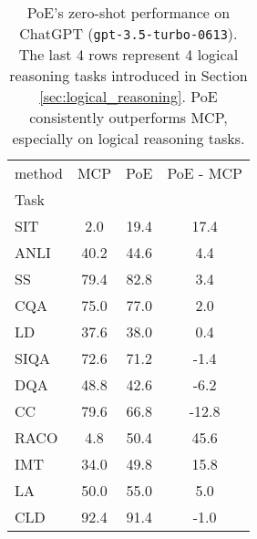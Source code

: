 \begin{table}[h]
\centering
\caption{PoE's zero-shot performance on ChatGPT (\texttt{gpt-3.5-turbo-0613}). The last 4 rows represent 4 logical reasoning tasks introduced in Section \ref{sec:logical_reasoning}. PoE consistently outperforms MCP, especially on logical reasoning tasks.}
\label{tab:llm}
\begin{tabular}{l|c|c|c}
method & MCP & PoE & PoE - MCP \\
Task &  &  &  \\
SIT & 2.0 & 19.4 & 17.4 \\
ANLI & 40.2 & 44.6 & 4.4 \\
SS & 79.4 & 82.8 & 3.4 \\
CQA & 75.0 & 77.0 & 2.0 \\
LD & 37.6 & 38.0 & 0.4 \\
SIQA & 72.6 & 71.2 & -1.4 \\
DQA & 48.8 & 42.6 & -6.2 \\
CC & 79.6 & 66.8 & -12.8 \\
RACO & 4.8 & 50.4 & 45.6 \\
IMT & 34.0 & 49.8 & 15.8 \\
LA & 50.0 & 55.0 & 5.0 \\
CLD & 92.4 & 91.4 & -1.0 \\
\end{tabular}
\end{table}
